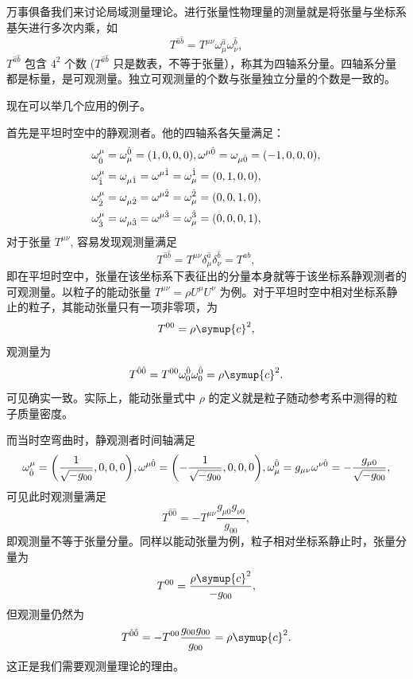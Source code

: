 \documentclass[UTF8, 12pt, a4paper, oneside, onecolumn, fontset=none]{ctexart}
\begin{document}
万事俱备我们来讨论局域测量理论。进行张量性物理量的测量就是将张量与坐标系基矢进行多次内乘，如
\begin{equation}
T^{\hat{a}\hat{b}}=T^{\mu\nu}\omega_{\mu}^{\hat{a}}\omega_{\nu}^{\hat{b}},
\end{equation}
$T^{\hat{a}\hat{b}}$ 包含 $4^{2}$ 个数 ($T^{\hat{a}\hat{b}}$ 只是数表，不等于张量），称其为四轴系分量。四轴系分量都是标量，是可观测量。独立可观测量的个数与张量独立分量的个数是一致的。

现在可以举几个应用的例子。

首先是平坦时空中的静观测者。他的四轴系各矢量满足：
\begin{align}
\omega_{\hat{0}}^{\mu}&=\omega_{\mu}^{\hat{0}}=\mleft(1, 0, 0, 0\mright),\omega^{\mu\hat{0}}=\omega_{\mu\hat{0}}=\mleft(-1, 0, 0, 0\mright),\label{2.3.21}\\
\omega_{\hat{1}}^{\mu}&=\omega_{\mu\hat{1}}=\omega^{\mu\hat{1}}=\omega_{\mu}^{\hat{1}}=\mleft(0, 1, 0, 0\mright),\\
\omega_{\hat{2}}^{\mu}&=\omega_{\mu\hat{2}}=\omega^{\mu\hat{2}}=\omega_{\mu}^{\hat{2}}=\mleft(0, 0, 1, 0\mright),\\
\omega_{\hat{3}}^{\mu}&=\omega_{\mu\hat{3}}=\omega^{\mu\hat{3}}=\omega_{\mu}^{\hat{3}}=\mleft(0, 0, 0, 1\mright),\label{2.3.24}
\end{align}
对于张量 $T^{\mu\nu}$, 容易发现观测量满足
\begin{equation}
T^{\hat{a}\hat{b}}=T^{\mu\nu}\delta^{\hat{a}}_{\mu}\delta^{\hat{b}}_{\nu}=T^{ab},
\end{equation}
即在平坦时空中，张量在该坐标系下表征出的分量本身就等于该坐标系静观测者的可观测量。以粒子的能动张量 $T^{\mu\nu}=\rho U^{\mu}U^{\nu}$ 为例。对于平坦时空中相对坐标系静止的粒子，其能动张量只有一项非零项，为
\begin{equation}
T^{00}=\rho \symup{c}^{2},
\end{equation}
观测量为
\begin{equation}
T^{\hat{0}\hat{0}}=T^{00}\omega_{0}^{\hat{0}}\omega_{0}^{\hat{0}}=\rho \symup{c}^{2}.
\end{equation}
可见确实一致。实际上，能动张量式中 $\rho$ 的定义就是粒子随动参考系中测得的粒子质量密度。

而当时空弯曲时，静观测者时间轴满足
\begin{equation}
\omega^{\mu}_{\hat{0}}=\mleft(\frac{1}{\sqrt{-g_{00}}}, 0, 0, 0\mright),\omega^{\mu\hat{0}}=\mleft(-\frac{1}{\sqrt{-g_{00}}}, 0, 0, 0\mright),\omega_{\mu}^{\hat{0}}=g_{\mu\nu}\omega^{\nu\hat{0}}=-\frac{g_{\mu0}}{\sqrt{-g_{00}}},
\end{equation}
可见此时观测量满足
\begin{equation}
T^{\hat{0}\hat{0}}=-T^{\mu\nu}\frac{g_{\mu0}g_{\nu0}}{g_{00}},
\end{equation}
即观测量不等于张量分量。同样以能动张量为例，粒子相对坐标系静止时，张量分量为
\begin{equation}
T^{00}=\frac{\rho \symup{c}^{2}}{-g_{00}},
\end{equation}
但观测量仍然为
\begin{equation}
T^{\hat{0}\hat{0}}=-T^{00}\frac{g_{00}g_{00}}{g_{00}}=\rho \symup{c}^{2}.
\end{equation}
这正是我们需要观测量理论的理由。
\end{document}

